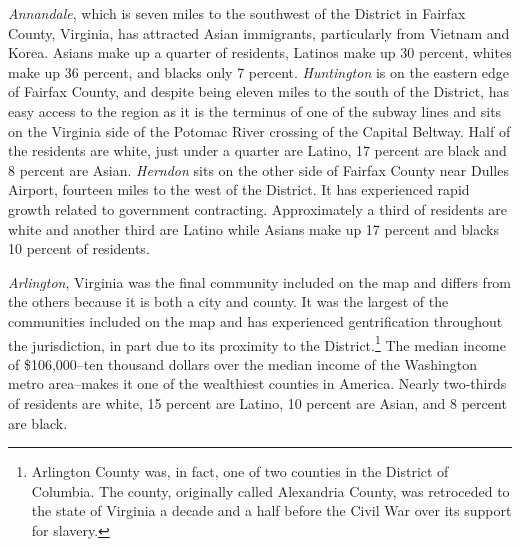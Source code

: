 \documentclass[11pt]{baderart}
\begin{document}
\emph{Annandale}, which is seven miles to the southwest of the District in Fairfax County, Virginia, has attracted Asian immigrants, particularly from Vietnam and Korea. Asians make up a quarter of residents, Latinos make up 30 percent, whites make up 36 percent, and blacks only 7 percent. \emph{Huntington} is on the eastern edge of Fairfax County, and despite being eleven miles to the south of the District, has easy access to the region as it is the terminus of one of the subway lines and sits on the Virginia side of the Potomac River crossing of the Capital Beltway. Half of the residents are white, just under a quarter are Latino, 17 percent are black and 8 percent are Asian. \emph{Herndon} sits on the other side of Fairfax County near Dulles Airport, fourteen miles to the west of the District. It has experienced rapid growth related to government contracting. Approximately a third of residents are white and another third are Latino while Asians make up 17 percent and blacks 10 percent of residents. 

\emph{Arlington}, Virginia was the final community included on the map and differs from the others because it is both a city and county. It was the largest of the communities included on the map and has experienced gentrification throughout the jurisdiction, in part due to its proximity to the District.\footnote{Arlington County was, in fact, one of two counties in the District of Columbia. The county, originally called Alexandria County, was retroceded to the state of Virginia a decade and a half before the Civil War over its support for slavery.} The median income of \$106,000--ten thousand dollars over the median income of the Washington metro area--makes it one of the wealthiest counties in America. Nearly two-thirds of residents are white, 15 percent are Latino, 10 percent are Asian, and 8 percent are black. 




\end{document}
